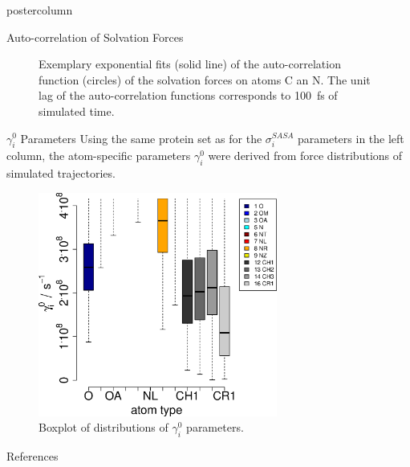 \documentclass{beamer}
\newcommand{\sig}{$\sigma_i^{SASA}$}
\newcommand{\gam}{$\gamma_i^0$}
\begin{document}
\begin{frame}
\begin{columns}
\begin{column}{.45\textwidth}
\begin{beamercolorbox}[center]{postercolumn}
\begin{minipage}{.98\textwidth}
{\begin{myblock}{Auto-correlation of Solvation Forces}
\begin{figure}
\begin{minipage}{1.0\textwidth}
\caption{Exemplary exponential fits (solid line) of the auto-correlation function
(circles) of the solvation forces on atoms C an N. The unit lag of the 
auto-correlation functions corresponds to 100~fs of simulated time.}
\label{fig:expfit}
\end{minipage}
\end{figure}
\end{myblock}\vfill
\begin{myblock}{\gam{} Parameters}
Using the same protein set as for the \sig{} parameters in the left column,
the atom-specific parameters \gam{} were derived from force distributions
of simulated trajectories.
\begin{figure}
\begin{minipage}{1.0\textwidth}
\centering\includegraphics[width=0.7\textwidth]{./boxplot_gamma.all.eps}
\caption{Boxplot of distributions of \gam{} parameters.}
\label{fig:gammadstr}
\end{minipage}
\end{figure}
\end{myblock}\vfill
\begin{myblock}{References}
\footnotesize


\end{myblock}\vfill
}\end{minipage}
\end{beamercolorbox}
\end{column}
\end{columns}
\end{frame}
\end{document}
